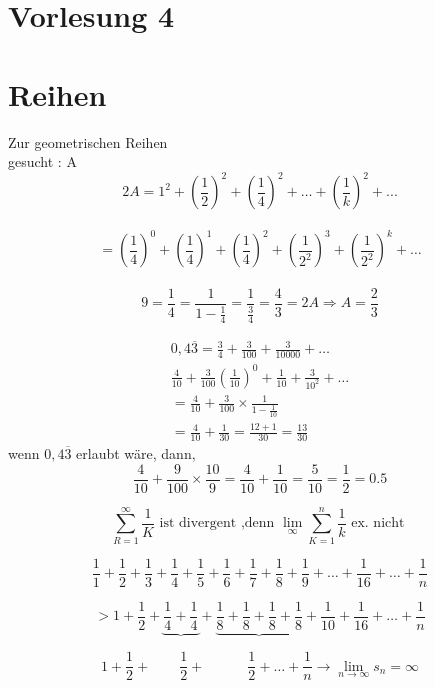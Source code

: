 


\section{Vorlesung 4}

\section{Reihen}
\begin{example}{Zur geometrischen Reihen}\\
gesucht : A
\[2A = 1^2 + (\frac{1}{2})^2+(\frac{1}{4})^2 + \dots + (\frac{1}{k})^2 + ... \]\\
\[= (\frac{1}{4})^0 + (\frac{1}{4})^1+ (\frac{1}{4})^2+(\frac{1}{2^2})^3+(\frac{1}{2^2})^k+ \dots \]\\
\[9 = \frac{1}{4} = \frac{1}{1- \frac{1}{4}} = \frac{1}{\frac{3}{4}} = \frac{4}{3}= 2A \Rightarrow A = \frac{2}{3}\] 
\end{example}

\begin{example}
\begin{equation}
\begin{aligned}
0,4 \overline{3} = \frac{3}{4} + \frac{3}{100} + \frac{3}{10000}+ \dots \\
\frac{4}{10} + \frac{3}{100}(\frac{1}{10})^0 + \frac{1}{10} + \frac{3}{10^2} + \dots \\
=\frac{4}{10} + \frac{3}{100} \times \frac{1}{1-\frac{1}{10}}\\
= \frac{4}{10}+ \frac{1}{30} = \frac{12+1}{30}= \frac{13}{30}
\end{aligned}
\end{equation}
wenn $0,4 \overline{3}$ erlaubt wäre, dann,\\
\[\frac{4}{10} + \frac{9}{100} \times \frac{10}{9} = \frac{4}{10} + \frac{1}{10} = \frac{5}{10} = \frac{1}{2} = 0.5  \]
\end{example}

\newpage
\begin{example}
	\[\sum_{R=1}^{\infty} \frac{1}{K} \text{ ist divergent ,denn  } \lim\limits_{\infty} \sum_{K=1}^{n} \frac{1}{k} \text{ ex. nicht } \]
	
	\[\frac{1}{1}+\frac{1}{2}+\frac{1}{3}+\frac{1}{4}+\frac{1}{5}+\frac{1}{6}+\frac{1}{7}+\frac{1}{8}+\frac{1}{9}+\dots+\frac{1}{16}+\dots+\frac{1}{n}\]
	
	\[ > 1+\frac{1}{2}+  \underbrace{\frac{1}{4}+\frac{1}{4}}+\underbrace{\frac{1}{8}+\frac{1}{8}+\frac{1}{8}+\frac{1}{8}}+\frac{1}{10}+\frac{1}{16}+\dots+\frac{1}{n}\] 
	
	\[1+\frac{1}{2} + \qquad \frac{1}{2}+   \quad  \qquad \frac{1}{2}  + \dots + \frac{1}{n}  \rightarrow \lim\limits_{n\rightarrow \infty }s_n = \infty \]
	
\end{example}
